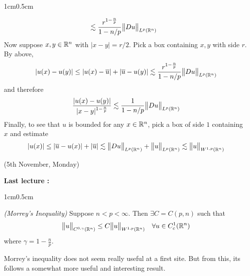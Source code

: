 \documentclass[10pt,a4paper]{report}
\newenvironment{proof}
{\begin{changemargin}{1cm}{0.5cm} 
	}%
	{\end{changemargin}
}
\begin{document}
\begin{proof}
\begin{align*}
&\lesssim \frac{r^{1-\frac{n}{p}}}{1-n/p} \bigl\lVert Du\bigr\rVert_{L^p(\mathbb{R}^n)}
\end{align*}
Now suppose $x,y\in \mathbb{R}^n$ with $|x-y| = r/2$. Pick a box containing $x,y$ with side $r$. By above,
\begin{align*}
|u(x) - u(y)| \leq |u(x)- \overline{u}| + |\overline{u} - u(y) | \lesssim \frac{r^{1-\frac{n}{p}}}{1-n/p} \bigl\lVert Du\bigr\rVert_{L^p(\mathbb{R}^n)}
\end{align*}
and therefore
\begin{align*}
\frac{|u(x)-u(y)|}{|x-y|^{1-\frac{n}{p}}} \lesssim \frac{1}{1-n/p} \bigl\lVert Du\bigr\rVert_{L^p(\mathbb{R}^n)}
\end{align*}
Finally, to see that $u$ is bounded for any $x\in \mathbb{R}^n$, pick a box of side $1$ containing $x$ and estimate
\begin{align*}
|u(x)| \leq |\overline{u}-u(x)| + |\overline{u}| \lesssim \bigl\lVert Du\bigr\rVert_{L^p(\mathbb{R}^n)} + \bigl\lVert u\bigr\rVert_{L^p(\mathbb{R}^n)} \lesssim \bigl\lVert u\bigr\rVert_{W^{1,p}(\mathbb{R}^n)}
\end{align*}

\eop
\end{proof}
\s

\newday

(5th November, Monday)
\s

\textbf{Last lecture :}
\begin{proof}
\thm \emph{(Morrey's Inequality)} Suppose $n<p<\infty$. Then $\exists C = C(p,n)$ such that
\begin{align*}
\bigl\lVert u\bigr\rVert_{C^{0,\gamma}(\mathbb{R}^n)} \leq C\bigl\lVert u\bigr\rVert_{W^{1,p}(\mathbb{R}^n)} \quad \forall u \in C_c^1(\mathbb{R}^n)
\end{align*}
where $\gamma = 1-\frac{n}{p}$.
\end{proof}
\s

Morrey's inequality does not seem really useful at a first site. But from this, its follows a somewhat more useful and interesting result.
\s
\end{document}
